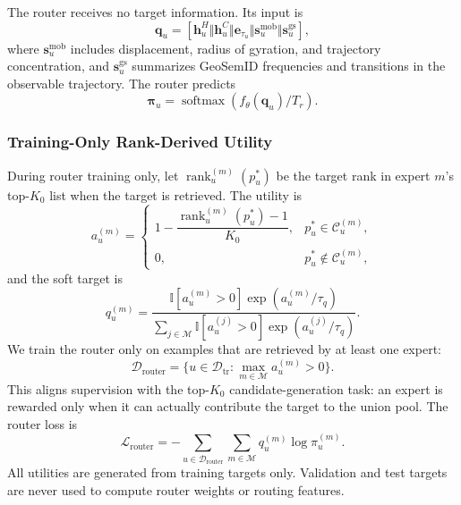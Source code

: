 \documentclass[journal]{IEEEtran}
\newcommand{\Experts}{\mathcal{M}}
\newcommand{\Train}{\mathcal{D}_{\mathrm{tr}}}
\newcommand{\Ind}{\mathbb{I}}
\begin{document}
The router receives no target information.
Its input is
\begin{equation}
\bm{q}_{u}
=
[
\bm{h}_{u}^{H}
\Vert
\bm{h}_{u}^{C}
\Vert
\bm{e}_{\tau_u}
\Vert
\bm{s}_{u}^{\mathrm{mob}}
\Vert
\bm{s}_{u}^{\mathrm{gs}}
],
\label{eq:routing_context}
\end{equation}
where $\bm{s}_{u}^{\mathrm{mob}}$ includes displacement, radius of gyration,
and trajectory concentration, and $\bm{s}_{u}^{\mathrm{gs}}$ summarizes
GeoSemID frequencies and transitions in the observable trajectory.
The router predicts
\begin{equation}
\bm{\pi}_{u}
=
\operatorname{softmax}(f_{\theta}(\bm{q}_{u})/T_r).
\label{eq:router_output}
\end{equation}

\subsubsection{Training-Only Rank-Derived Utility}

During router training only, let $\operatorname{rank}_{u}^{(m)}(p_u^{*})$ be
the target rank in expert $m$'s top-$K_0$ list when the target is retrieved.
The utility is
\begin{equation}
a_{u}^{(m)}
=
\begin{cases}
1-\dfrac{\operatorname{rank}_{u}^{(m)}(p_u^{*})-1}{K_0},
&p_u^{*}\in\mathcal{C}_{u}^{(m)},\\[7pt]
0,&p_u^{*}\notin\mathcal{C}_{u}^{(m)},
\end{cases}
\label{eq:expert_utility}
\end{equation}
and the soft target is
\begin{equation}
q_{u}^{(m)}
=
\frac{
\Ind[a_u^{(m)}>0]\exp(a_{u}^{(m)}/\tau_q)
}{
\sum_{j\in\Experts}
\Ind[a_u^{(j)}>0]\exp(a_{u}^{(j)}/\tau_q)
}.
\label{eq:utility_target}
\end{equation}
We train the router only on examples that are retrieved by at least one expert:
\begin{equation}
\mathcal{D}_{\mathrm{router}}
=
\{u\in\Train:\max_{m\in\Experts}a_u^{(m)}>0\}.
\label{eq:router_training_set}
\end{equation}
This aligns supervision with the top-$K_0$ candidate-generation task: an expert
is rewarded only when it can actually contribute the target to the union pool.
The router loss is
\begin{equation}
\mathcal{L}_{\mathrm{router}}
=
-
\sum_{u\in\mathcal{D}_{\mathrm{router}}}
\sum_{m\in\Experts}
q_{u}^{(m)}\log\pi_{u}^{(m)}.
\label{eq:router_loss}
\end{equation}
All utilities are generated from training targets only.
Validation and test targets are never used to compute router weights or
routing features.
\end{document}

